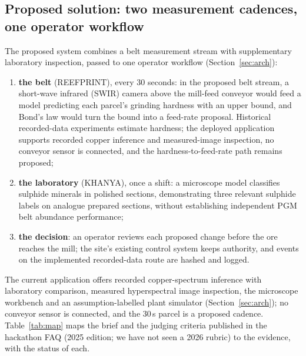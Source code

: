 \documentclass[10pt,a4paper,twocolumn]{article}
\begin{document}
\subsection{Proposed solution: two measurement cadences, one operator workflow}

The proposed system combines a belt measurement stream with supplementary laboratory inspection, passed to one operator workflow (Section~\ref{sec:arch}):
\begin{enumerate}
\item \textbf{the belt} (REEFPRINT), every 30 seconds: in the proposed belt stream, a short-wave infrared (SWIR) camera above the mill-feed conveyor would feed a model predicting each parcel's grinding hardness with an upper bound, and Bond's law would turn the bound into a feed-rate proposal. Historical recorded-data experiments estimate hardness; the deployed application supports recorded copper inference and measured-image inspection, no conveyor sensor is connected, and the hardness-to-feed-rate path remains proposed;
\item \textbf{the laboratory} (KHANYA), once a shift: a microscope model classifies sulphide minerals in polished sections, demonstrating three relevant sulphide labels on analogue prepared sections, without establishing independent PGM belt abundance performance;
\item \textbf{the decision}: an operator reviews each proposed change before the ore reaches the mill; the site's existing control system keeps authority, and events on the implemented recorded-data route are hashed and logged.
\end{enumerate}
The current application offers recorded copper-spectrum inference with laboratory comparison, measured hyperspectral image inspection, the microscope workbench and an assumption-labelled plant simulator (Section~\ref{sec:arch}); no conveyor sensor is connected, and the 30\,s parcel is a proposed cadence. Table~\ref{tab:map} maps the brief and the judging criteria published in the hackathon FAQ (2025 edition; we have not seen a 2026 rubric) \cite{faq} to the evidence, with the status of each.
\end{document}
